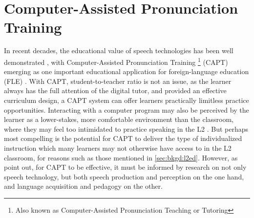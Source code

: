 \section{Computer-Assisted Pronunciation Training}
\label{sec:bkgd:capt}


In recent decades, the educational value of speech technologies has been well demonstrated \citep{Eskenazi2009}, with 
Computer-Assisted Pronunciation Training%
\footnote{Also known as Computer-Assisted Pronunciation Teaching or Tutoring} (CAPT) 
emerging as one important educational application for foreign-language education (FLE) \citep{Neri2002,Delmonte2011,Witt2012}. 
With CAPT, student-to-teacher ratio is not an issue, as the learner always has the full attention of the digital tutor, and provided an effective curriculum design, a CAPT system can offer learners practically limitless practice opportunities. Interacting with a computer program may also be perceived by the learner as a lower-stakes, more comfortable environment than the classroom, where they may feel too intimidated to practice speaking in the L2 \citep{Neri2002}. But perhaps most compelling is the potential for CAPT 
to deliver the type of individualized instruction
which many learners may not otherwise have access to in the L2 classroom, for reasons such as those mentioned in \cref{sec:bkgd:l2ed}.
%
However, as \textcite{Derwing2005} point out, for CAPT to be effective, it must be informed by research on not only speech technology, but both speech production and perception on the one hand, and language acquisition and pedagogy on the other.
